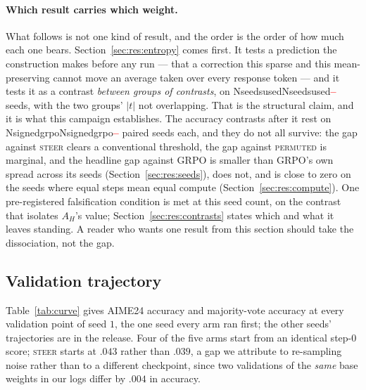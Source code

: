 \documentclass[11pt]{article}
\newcommand{\AH}{A_{H}}
\providecommand{\PENDING}{\textcolor{red}{\textbf{--}}}
\newcommand{\num}[1]{\ifcsname #1\endcsname\csname #1\endcsname\else\PENDING\fi}
\begin{document}
\paragraph{Which result carries which weight.} What follows is not one kind of
result, and the order is the order of how much each one bears.
Section~\ref{sec:res:entropy} comes first. It tests a prediction the construction
makes before any run --- that a correction this sparse and this mean-preserving
cannot move an average taken over every response token --- and it tests it as a
contrast \emph{between groups of contrasts}, on \num{Nseedsused} seeds, with
the two groups' $|t|$ not overlapping. That is the structural claim, and it is what
this campaign establishes. The accuracy contrasts after it rest on
\num{Nsignedgrpo} paired seeds each, and they do not all survive: the gap against
\textsc{steer} clears a conventional threshold, the gap against \textsc{permuted} is
marginal, and the headline gap against GRPO is smaller than GRPO's own spread across
its seeds (Section~\ref{sec:res:seeds}), does not, and is close to zero on the
seeds where equal steps mean equal compute (Section~\ref{sec:res:compute}). One pre-registered
falsification condition is met at this seed count, on the contrast that isolates
$\AH$'s value; Section~\ref{sec:res:contrasts} states which and what it leaves
standing. A reader who wants one result from this section should take the
dissociation, not the gap.


\subsection{Validation trajectory}
\label{sec:res:curve}

Table~\ref{tab:curve} gives AIME24 accuracy and majority-vote accuracy at every
validation point of seed $1$, the one seed every arm ran first; the other seeds'
trajectories are in the release. Four of the five arms start from an identical
step-0 score; \textsc{steer} starts at $.043$ rather than $.039$, a gap we
attribute to re-sampling noise rather than to a different checkpoint, since two
validations of the \emph{same} base weights in our logs differ by $.004$ in
accuracy.
\end{document}
